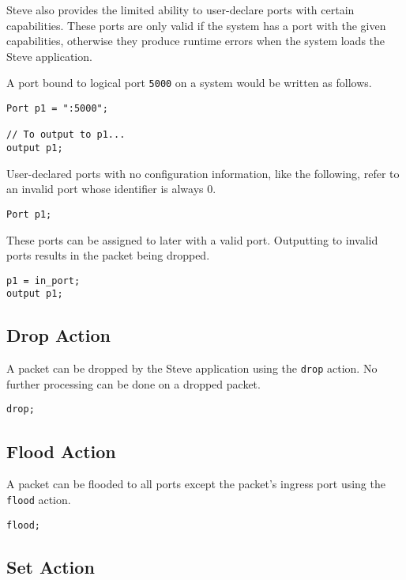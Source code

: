 Steve also provides the limited ability to user-declare ports with certain capabilities. These ports are only valid if the system has a port with the given capabilities, otherwise they produce runtime errors when the system loads the Steve application.

A port bound to logical port \texttt{5000} on a system would be written as follows.

\begin{lstlisting}
Port p1 = ":5000";

// To output to p1...
output p1;
\end{lstlisting}

User-declared ports with no configuration information, like the following, refer to an invalid port whose identifier is always 0. 

\begin{lstlisting}
Port p1;
\end{lstlisting}

These ports can be assigned to later with a valid port. Outputting to invalid ports results in the packet being dropped.

\begin{lstlisting}
p1 = in_port;
output p1;
\end{lstlisting}

\subsection{Drop Action} \label{drop_action_tut}

A packet can be dropped by the Steve application using the \texttt{drop} action. No further processing can be done on a dropped packet.

\begin{lstlisting}
drop;
\end{lstlisting}

\subsection{Flood Action} \label{flood_action_tut}

A packet can be flooded to all ports except the packet's ingress port using the \texttt{flood} action.

\begin{lstlisting}
flood;
\end{lstlisting}

\subsection{Set Action} \label{set_action_tut}

